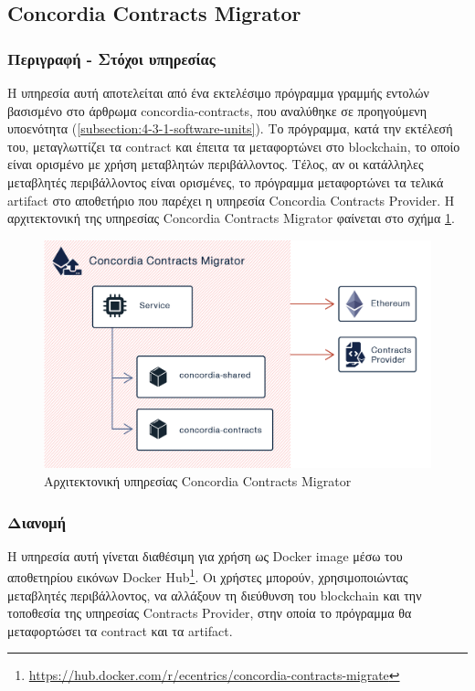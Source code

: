 \subsection{Concordia Contracts Migrator} \label{subsection:4-3-3-concordia-contracts-migrator}

\subsubsection{Περιγραφή - Στόχοι υπηρεσίας}

Η υπηρεσία αυτή αποτελείται από ένα εκτελέσιμο πρόγραμμα γραμμής εντολών βασισμένο στο άρθρωμα concordia-contracts, που αναλύθηκε σε προηγούμενη υποενότητα (\ref{subsection:4-3-1-software-units}). Το πρόγραμμα, κατά την εκτέλεσή του, μεταγλωττίζει τα contract και έπειτα τα μεταφορτώνει στο blockchain, το οποίο είναι ορισμένο με χρήση μεταβλητών περιβάλλοντος. Τέλος, αν οι κατάλληλες μεταβλητές περιβάλλοντος είναι ορισμένες, το πρόγραμμα μεταφορτώνει τα τελικά artifact στο αποθετήριο που παρέχει η υπηρεσία Concordia Contracts Provider. Η αρχιτεκτονική της υπηρεσίας Concordia Contracts Migrator φαίνεται στο σχήμα \ref{figure:4-3-concordia-contracts-migrator-architecture}.

\vspace{.5\baselineskip}

\begin{figure}[H]
    \centering
    \includegraphics[width=.75\textwidth]{assets/figures/chapter-4/4.3.architecture-4.3.3.concordia-contracts-migrator-architecture.png}
    \caption{Αρχιτεκτονική υπηρεσίας Concordia Contracts Migrator}
    \label{figure:4-3-concordia-contracts-migrator-architecture}
\end{figure}

\subsubsection{Διανομή}

Η υπηρεσία αυτή γίνεται διαθέσιμη για χρήση ως Docker image μέσω του αποθετηρίου εικόνων Docker Hub\footnote{\url{https://hub.docker.com/r/ecentrics/concordia-contracts-migrate}}. Οι χρήστες μπορούν, χρησιμοποιώντας μεταβλητές περιβάλλοντος, να αλλάξουν τη διεύθυνση του blockchain και την τοποθεσία της υπηρεσίας Contracts Provider, στην οποία το πρόγραμμα θα μεταφορτώσει τα contract και τα artifact.